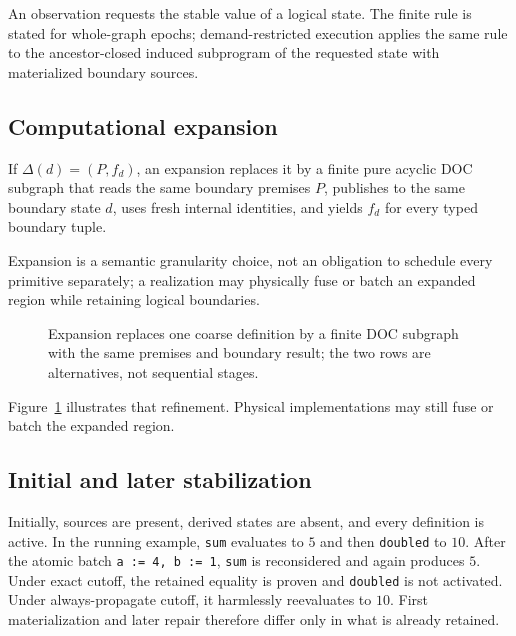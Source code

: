 An observation requests the stable value of a logical state. The finite rule is stated for whole-graph epochs; demand-restricted execution applies the same rule to the ancestor-closed induced subprogram of the requested state with materialized boundary sources.

\subsection{Computational expansion}
\begin{definition}[Expansion]\label{def:expansion}
If $\Delta(d)=(P,f_d)$, an expansion replaces it by a finite pure acyclic DOC subgraph that reads the same boundary premises $P$, publishes to the same boundary state $d$, uses fresh internal identities, and yields $f_d$ for every typed boundary tuple.
\end{definition}
Expansion is a semantic granularity choice, not an obligation to schedule every primitive separately; a realization may physically fuse or batch an expanded region while retaining logical boundaries.

\iffullvisuals
\begin{figure}[t]
\centering
{}
\caption{Expansion replaces one coarse definition by a finite DOC subgraph with the same premises and boundary result; the two rows are alternatives, not sequential stages.}\label{fig:expansion}
\end{figure}
Figure~\ref{fig:expansion} illustrates that refinement. Physical implementations may still fuse or batch the expanded region.
\fi

\subsection{Initial and later stabilization}
Initially, sources are present, derived states are absent, and every definition is active. In the running example, \texttt{sum} evaluates to $5$ and then \texttt{doubled} to $10$. After the atomic batch \texttt{a := 4, b := 1}, \texttt{sum} is reconsidered and again produces $5$. Under exact cutoff, the retained equality is proven and \texttt{doubled} is not activated. Under always-propagate cutoff, it harmlessly reevaluates to $10$. First materialization and later repair therefore differ only in what is already retained.


